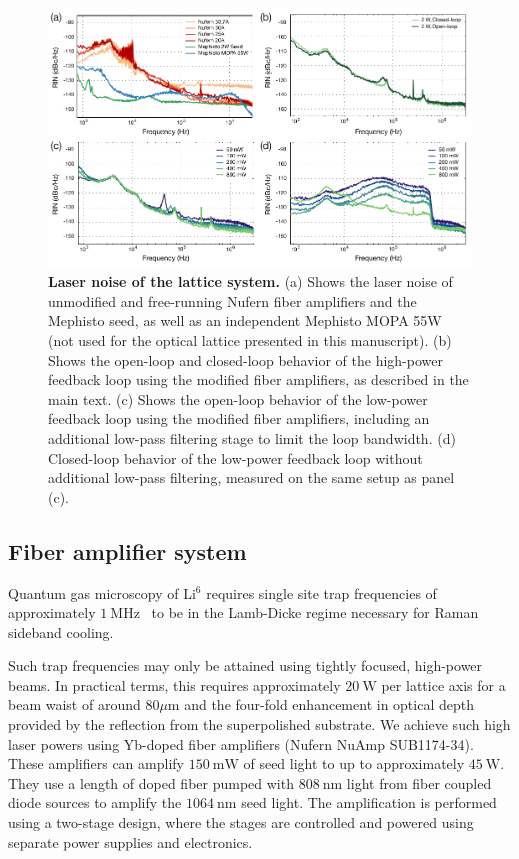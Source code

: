 \documentclass[twocolumn,aps,pra,showpacs,preprintnumbers,bibnotes]{revtex4-1}
\newcommand\unit[2]{\ensuremath{#1~\mathrm{{#2}}}}
\begin{document}
\begin{figure}
  \begin{center}
    \includegraphics{Figure2.pdf}
    \caption{\textbf{Laser noise of the lattice system.} (a) Shows the laser noise of unmodified and free-running Nufern fiber amplifiers and the Mephisto seed, as well as an independent Mephisto MOPA 55W (not used for the optical lattice presented in this manuscript). (b) Shows the open-loop and closed-loop behavior of the high-power feedback loop using the  modified fiber amplifiers, as described in the main text. (c) Shows the open-loop behavior of the low-power feedback loop using the modified fiber amplifiers, including an additional low-pass filtering stage to limit the loop bandwidth. (d) Closed-loop behavior of the low-power feedback loop without additional low-pass filtering, measured on the same setup as panel (c).}\label{fig:noises}
  \end{center}
\end{figure}

\subsection{Fiber amplifier system}
Quantum gas microscopy of Li$^6$ requires single site trap frequencies of approximately \unit{1}{MHz}~\cite{Parsons2015} to be in the Lamb-Dicke regime necessary for Raman sideband cooling.

Such trap frequencies may only be attained using tightly focused, high-power beams. 
In practical terms, this requires approximately \unit{20}{W} per lattice axis for a beam waist of around $80 \mu\mathrm{m}$ and the four-fold enhancement in optical depth provided by the reflection from the superpolished substrate. We achieve such high laser powers using Yb-doped fiber amplifiers (Nufern NuAmp SUB1174-34).
These amplifiers can amplify \unit{150}{mW} of seed light to up to approximately \unit{45}{W}. They use a length of doped fiber pumped with \unit{808}{nm} light from fiber coupled diode sources to amplify the \unit{1064}{nm} seed light.
The amplification is performed using a two-stage design, where the stages are controlled and powered using separate power supplies and electronics.
\end{document}
